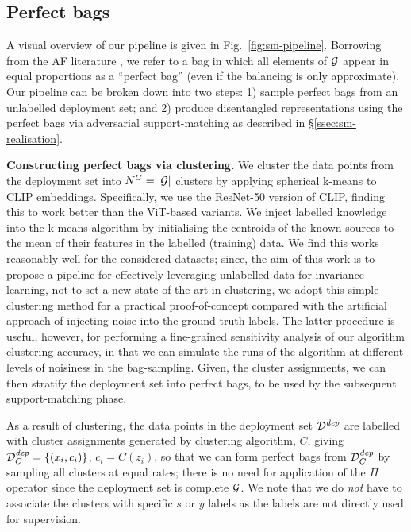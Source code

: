 %
\subsection{Perfect bags}\label{sec:sm-implementation}
%
A visual overview of our pipeline is given in Fig.~\ref{fig:sm-pipeline}. 
%
Borrowing from the \ac{AF} literature \citep{chouldechova17,KleMulRag16}, we refer to a bag in
which all elements of ${\mathcal{G}}$ appear in equal proportions as a ``perfect bag'' (even if the balancing
is only approximate). 
%
Our pipeline can be broken down into two steps: 1) sample perfect bags from an unlabelled
deployment set; and 2) produce disentangled representations using the perfect bags via adversarial
support-matching as described in \S\ref{ssec:sm-realisation}.

\textbf{Constructing perfect bags via clustering.}
%
We cluster the data points from the deployment set into \( N^C=|{\mathcal{G}}| \) clusters by applying
spherical k-means to CLIP \citep{radford2021learning} embeddings. 
%
Specifically, we use the ResNet-50 version of CLIP, finding this to work better than the ViT-based
variants. 
%
We inject labelled knowledge into the k-means algorithm by initialising the centroids of the known
sources to the mean of their features in the labelled (training) data. 
%
We find this works reasonably well for the considered datasets; since, the aim of this work is to
propose a pipeline for effectively leveraging unlabelled data for invariance-learning, not to set a
new state-of-the-art in clustering, we adopt this simple clustering method for a practical
proof-of-concept compared with the artificial approach of injecting noise into the ground-truth
labels. 
%
The latter procedure is useful, however, for performing a fine-grained sensitivity analysis of our
algorithm \wrt{} clustering accuracy, in that we can simulate the runs of the algorithm at
different levels of noisiness in the bag-sampling. 
%
%
Given, the cluster assignments, we can then stratify the deployment set into perfect bags, to be
used by the subsequent support-matching phase.

As a result of clustering, the data points in the deployment set \( {\mathcal{D}}^\mathit{dep} \) are
labelled with cluster assignments generated by clustering algorithm, \( C \), giving \(
{\mathcal{D}}^\mathit{dep}_C=\{(x_i, c_i)\} \), \(c_i = C(z_i) \),
%
so that we can form perfect bags from \( {\mathcal{D}}^\mathit{dep}_C \) by sampling all clusters at equal
rates; there is no need for application of the $\Pi$ operator since the deployment set is complete
\wrt{} ${\mathcal{G}}$.
%
We note that we do \emph{not} have to associate the clusters with specific $s$ or $y$ labels as the
labels are not directly used for supervision.


